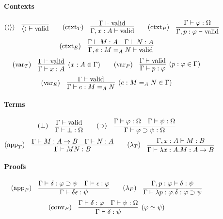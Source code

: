 \documentclass[a4paper,UKenglish]{lipics-v2016}
\newcommand*{\vald}{\ensuremath{\vdash \mathrm{valid}}}
\theoremstyle{plain}
\theoremstyle{definition}
\begin{document}
\newcommand{\RvarT}{\ensuremath(\mathsf{varT})}
\begin{figure}
\paragraph*{Contexts}
$$ (\langle \rangle) \quad \vcenter{\infer{\langle \rangle \vald}{}} \qquad
(\mathrm{ctxt}_T) \quad \vcenter{\infer{\Gamma, x : A \vald}{\Gamma \vald}} \qquad 
(\mathrm{ctxt}_P) \quad \vcenter{\infer{\Gamma, p : \varphi \vald}{\Gamma \vdash \varphi : \Omega}} $$
$$ (\mathrm{ctxt}_E) \quad \vcenter{\infer{\Gamma, e : M =_A N \vald}{\Gamma \vdash M : A \quad \Gamma \vdash N : A}} $$
$$ (\mathrm{var}_T) \quad \vcenter{\infer[(x : A \in \Gamma)]{\Gamma \vdash x : A}{\Gamma \vald}} \qquad
(\mathrm{var}_P) \quad \vcenter{\infer[(p : \varphi \in \Gamma)]{\Gamma \vdash p : \varphi}{\Gamma \vald}} $$
$$ (\mathrm{var}_E) \quad \vcenter{\infer[(e : M =_A N \in \Gamma)]{\Gamma \vdash e : M =_A N}{\Gamma \vald}} $$

\paragraph*{Terms}
$$ (\bot) \quad \vcenter{\infer{\Gamma \vdash \bot : \Omega}{\Gamma \vald}} \qquad
(\supset) \quad \vcenter{\infer{\Gamma \vdash \varphi \supset \psi : \Omega}{\Gamma \vdash \varphi : \Omega \quad \Gamma \vdash \psi : \Omega}} $$
$$ (\mathrm{app}_T) \quad \vcenter{\infer{\Gamma \vdash M N : B} {\Gamma \vdash M : A \rightarrow B \quad \Gamma \vdash N : A}} \qquad
(\lambda_T) \quad \vcenter{\infer{\Gamma \vdash \lambda x:A.M : A \rightarrow B}{\Gamma, x : A \vdash M : B}} $$

\paragraph*{Proofs}
$$ (\mathrm{app}_P) \quad \vcenter{\infer{\Gamma \vdash \delta \epsilon : \psi} {\Gamma \vdash \delta : \varphi \supset \psi \quad \Gamma \vdash \epsilon : \varphi}} \qquad
(\lambda_P) \quad \vcenter{\infer{\Gamma \vdash \lambda p : \varphi . \delta : \varphi \supset \psi}{\Gamma, p : \varphi \vdash \delta : \psi}} $$
$$ (\mathrm{conv}_P) \quad \vcenter{\infer[(\varphi \simeq \psi)]{\Gamma \vdash \delta : \psi}{\Gamma \vdash \delta : \varphi \quad \Gamma \vdash \psi : \Omega}} $$


\end{figure}
\end{document}
